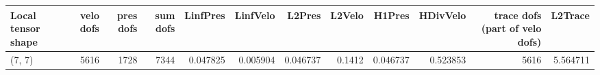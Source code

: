 \begin{tabular}{lrrrrrrrrrrr}
\toprule
Local tensor shape &  velo dofs &  pres dofs &  sum dofs &  LinfPres &  LinfVelo &   L2Pres &  L2Velo &   H1Pres &  HDivVelo &  trace dofs (part of velo dofs) &  L2Trace \\
\midrule
            (7, 7) &       5616 &       1728 &      7344 &  0.047825 &  0.005904 & 0.046737 &  0.1412 & 0.046737 &  0.523853 &                            5616 & 5.564711 \\
\bottomrule
\end{tabular}
